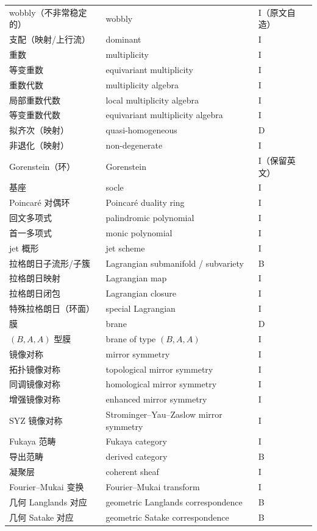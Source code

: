 \begin{longtable}{@{}p{5.4cm}p{6.3cm}p{2.2cm}@{}}
wobbly（不非常稳定的） & wobbly & I（原文自造）\\
支配（映射/上行流） & dominant & I\\
重数 & multiplicity & I\\
等变重数 & equivariant multiplicity & I\\
重数代数 & multiplicity algebra & I\\
局部重数代数 & local multiplicity algebra & I\\
等变重数代数 & equivariant multiplicity algebra & I\\
拟齐次（映射） & quasi-homogeneous & D\\
非退化（映射） & non-degenerate & I\\
Gorenstein（环） & Gorenstein & I（保留英文）\\
基座 & socle & I\\
Poincaré 对偶环 & Poincaré duality ring & I\\
回文多项式 & palindromic polynomial & I\\
首一多项式 & monic polynomial & I\\
jet 概形 & jet scheme & I\\
拉格朗日子流形/子簇 & Lagrangian submanifold / subvariety & B\\
拉格朗日映射 & Lagrangian map & I\\
拉格朗日闭包 & Lagrangian closure & I\\
特殊拉格朗日（环面） & special Lagrangian & I\\
膜 & brane & D\\
$(B,A,A)$ 型膜 & brane of type $(B,A,A)$ & I\\
镜像对称 & mirror symmetry & I\\
拓扑镜像对称 & topological mirror symmetry & I\\
同调镜像对称 & homological mirror symmetry & I\\
增强镜像对称 & enhanced mirror symmetry & I\\
SYZ 镜像对称 & Strominger--Yau--Zaslow mirror symmetry & I\\
Fukaya 范畴 & Fukaya category & I\\
导出范畴 & derived category & B\\
凝聚层 & coherent sheaf & I\\
Fourier--Mukai 变换 & Fourier--Mukai transform & I\\
几何 Langlands 对应 & geometric Langlands correspondence & B\\
几何 Satake 对应 & geometric Satake correspondence & B\\

\end{longtable}
